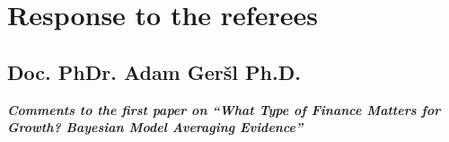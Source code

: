 \chapter{Response to the referees}
\section{Doc. PhDr. Adam Ger\v{s}l Ph.D.}

\textbf{\textit{Comments to the first paper on ``What Type of Finance Matters for Growth? Bayesian Model Averaging Evidence''}}




